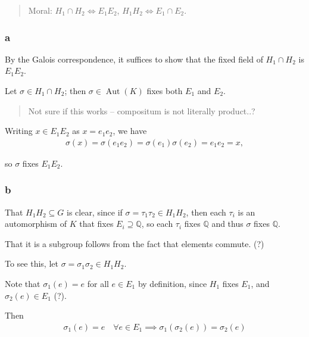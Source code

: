 \begin{solution}

\begin{quote}
Moral: \(H_1 \cap H_2 \iff E_1 E_2\), \(H_1 H_2 \iff E_1 \cap E_2\).
\end{quote}

\hypertarget{a-62}{%
\subsubsection{a}\label{a-62}}

By the Galois correspondence, it suffices to show that the fixed field
of \(H_1 \cap H_2\) is \(E_1 E_2\).

Let \(\sigma \in H_1 \cap H_2\); then
\(\sigma \in {\operatorname{Aut}}(K)\) fixes both \(E_1\) and \(E_2\).

\begin{quote}
Not sure if this works -- compositum is not literally product..?
\end{quote}

Writing \(x \in E_1E_2\) as \(x=e_1 e_2\), we have
\begin{align*}
\sigma(x) = \sigma(e_1 e_2) = \sigma(e_1) \sigma(e_2) = e_1 e_2  =x,
\end{align*}

so \(\sigma\) fixes \(E_1 E_2\).

\hypertarget{b-52}{%
\subsubsection{b}\label{b-52}}

That \(H_1 H_2 \subseteq G\) is clear, since if
\(\sigma = \tau_1 \tau_2 \in H_1 H_2\), then each \(\tau_i\) is an
automorphism of \(K\) that fixes \(E_i \supseteq {\mathbb{Q}}\), so each
\(\tau_i\) fixes \({\mathbb{Q}}\) and thus \(\sigma\) fixes
\({\mathbb{Q}}\).

That it is a subgroup follows from the fact that elements commute. (?)

To see this, let \(\sigma = \sigma_1 \sigma_2 \in H_1 H_2\).

Note that \(\sigma_1(e) = e\) for all \(e\in E_1\) by definition, since
\(H_1\) fixes \(E_1\), and \(\sigma_2(e) \in E_1\) (?).

Then
\begin{align*}
\sigma_1(e) = e \quad \forall e \in E_1 \implies \sigma_1(\sigma_2(e)) = \sigma_2(e) 
\end{align*}


\end{solution}
